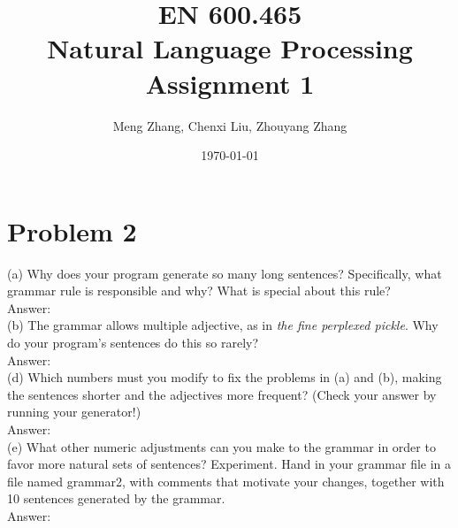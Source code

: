 \documentclass[a4paper, 11pt]{article}
\begin{document}
\date{\today}
\author{Meng Zhang, Chenxi Liu, Zhouyang Zhang}
\title{\textbf{EN 600.465 \\Natural Language Processing\\Assignment 1\\ }}

\maketitle
\section{Problem 2}
(a) Why does your program generate so many long sentences? Specifically, what grammar rule is responsible and why? What is special about this rule?\\
Answer: \\
(b) The grammar allows multiple adjective, as in \textit{the fine perplexed pickle}. Why do your program's sentences do this so rarely? \\
Answer: \\
(d) Which  numbers  must  you  modify  to  fix  the  problems  in  (a)  and  (b),  making  the  sentences shorter and the adjectives more frequent? (Check your answer by running your generator!) \\
Answer: \\
(e) What other numeric adjustments can you make to the grammar in order to favor more natural sets of sentences?  Experiment.  Hand in your grammar file in a file named grammar2, with comments that motivate your changes, together with 10 sentences generated by the grammar. \\
Answer: \\




\end{document}

